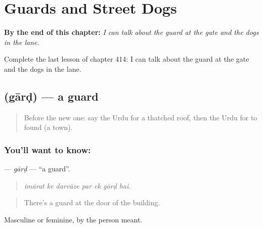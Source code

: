 
\chapter{Guards and Street Dogs}
\label{ch:ur-guards-and-street-dogs}

\begin{chapteropening}
\textbf{By the end of this chapter:} \emph{I can talk about the guard at the gate and the dogs in the lane.}

Complete the last lesson of chapter 414: I can talk about the guard at the gate and the dogs in the lane.
\end{chapteropening}

\section[\texorpdfstring{\ur{گارڈ} (gārḍ)}{گارڈ (gārḍ)}]{ (gārḍ) — a guard}

\label{lesson:UR-C414-gard}



\begin{quote}
Before the new one: say the Urdu for a thatched roof, then the Urdu for to found (a town).
\end{quote}

\subsection*{You'll want to know: }
\textbf{} — \emph{gārḍ} — \textquotedblleft{}a guard\textquotedblright{}.

\begin{quote}
      
\end{quote}

\begin{quote}
\emph{imārat ke darvāze par ek gārḍ hai.}
\end{quote}

\begin{quote}
There's a guard at the door of the building.
\end{quote}

Masculine or feminine, by the person meant.

